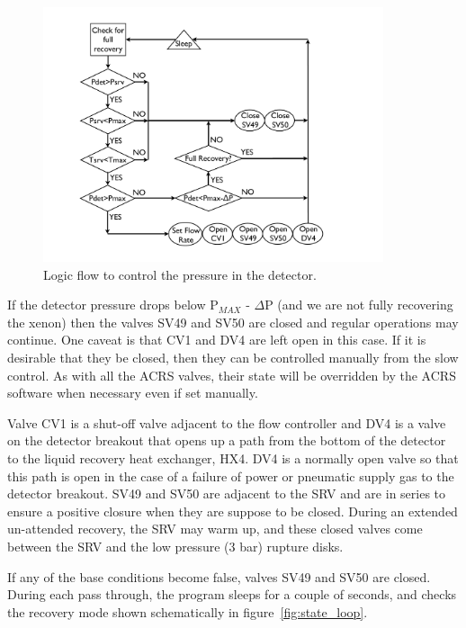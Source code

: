\documentclass[12pt]{article}
\begin{document}
\begin{figure}[ht]
\begin{center}
\includegraphics[width=10cm]{"figs/press_ctrl_loop_state_diagram"}
\caption{Logic flow to control the pressure in the detector.}
\label{fig:p_red_loop}
\end{center}
\end{figure}

If the detector pressure drops below P$_{MAX}$ - $\Delta$P (and we are not fully recovering the xenon) then the valves SV49 and SV50 are closed and regular operations may continue.  One caveat is that CV1 and DV4 are left open in this case.  If it is desirable that they be closed, then they can be controlled manually from the slow control.  As with all the ACRS valves, their state will be overridden by the ACRS software when necessary even if set manually.

Valve CV1 is a shut-off valve adjacent to the flow controller and DV4 is a valve on the detector breakout that opens up a path from the bottom of the detector to the liquid recovery heat exchanger, HX4.  DV4 is a normally open valve so that this path is open in the case of a failure of power or pneumatic supply gas to the detector breakout.    SV49 and SV50 are adjacent to the SRV and are in series to ensure a positive closure when they are suppose to be closed.  During an extended un-attended recovery, the SRV may warm up, and these closed valves come between the SRV and the low pressure (3 bar) rupture disks.

If any of the base conditions become false, valves SV49 and SV50 are closed.  During each pass through, the program sleeps for a couple of seconds, and checks the recovery mode shown schematically in figure~\ref{fig:state_loop}. 
\end{document}

